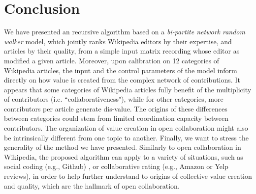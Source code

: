 \section{Conclusion}
We have presented an recursive algorithm based on a {\it bi-partite network random walker} model, which jointly ranks Wikipedia editors by their expertise, and articles by their quality, from a simple input matrix recording whose editor as modified a given article. Moreover, upon calibration on 12 categories of Wikipedia articles, the input and the control parameters of the model inform directly on how value is created from the complex network of contributions. It appears that some categories of Wikipedia articles fully benefit of the multiplicity of contributors (i.e. ``collaborativeness"), while for other categories, more contributors per article generate dis-value. The origins of these differences between categories could stem from limited coordination capacity between contributors. The organization of value creation in open collaboration might also be intrinsically different from one topic to another. Finally, we want to stress the generality of the method we have presented. Similarly to open collaboration in Wikipedia, the proposed algorithm can apply to a variety of  situations, such as social coding (e.g., Github) , or collaborative rating (e.g., Amazon or Yelp reviews), in order to help further understand to origins of collective value creation and quality, which are the hallmark of open collaboration.